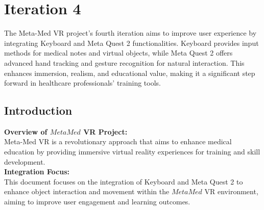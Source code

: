 \chapter{Iteration 4}
\label{ch:iter4}
The Meta-Med VR project's fourth iteration aims to improve user experience by integrating Keyboard and Meta Quest 2 functionalities. Keyboard provides input methods for medical notes and virtual objects, while Meta Quest 2 offers advanced hand tracking and gesture recognition for natural interaction. This enhances immersion, realism, and educational value, making it a significant step forward in healthcare professionals' training tools.
\section{Introduction}
\textbf{Overview of $MetaMed$ VR Project:}\\
Meta-Med VR is a revolutionary approach that aims to enhance medical education by providing immersive virtual reality experiences for training and skill development.\\
\textbf{Integration Focus:}\\
This document focuses on the integration of Keyboard and Meta Quest 2 to enhance object interaction and movement within the $Meta Med$ VR environment, aiming to improve user engagement and learning outcomes.
